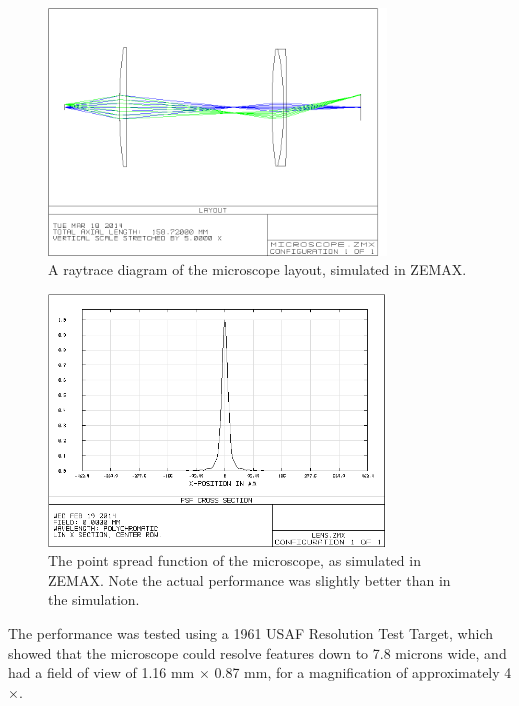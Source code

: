 \begin{figure}[h!]
\centering
\includegraphics[width=0.8\textwidth]{Images/Microscope/microscope_layout_3.png}
\caption{A raytrace diagram of the microscope layout, simulated in ZEMAX.}
\end{figure}

\begin{figure}[h!]
\centering
\includegraphics[width=0.8\textwidth]{Images/Microscope/microscope_psf.png}
\caption{The point spread function of the microscope, as simulated in ZEMAX. Note the actual performance was slightly better than in the simulation.}
\end{figure}

The performance was tested using a 1961 USAF Resolution Test Target, which showed that the microscope could resolve features down to 7.8 microns wide, and had a field of view of 1.16 mm $\times$ 0.87 mm, for a magnification of approximately 4$\times$.

